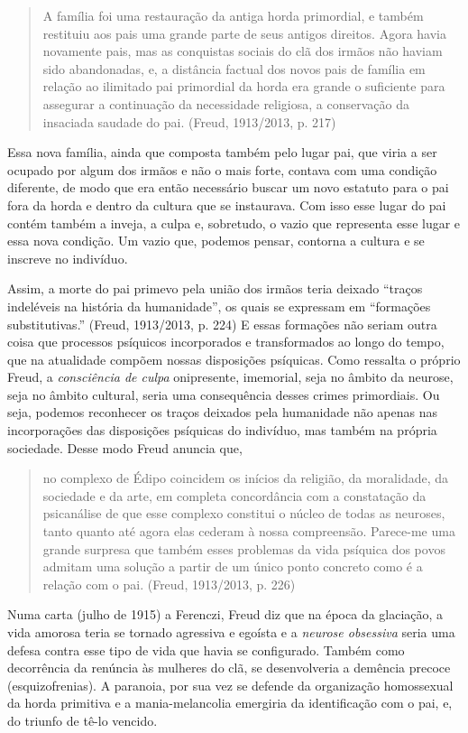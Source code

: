 \begin{quote}
A família foi uma restauração da antiga horda primordial, e também
restituiu aos pais uma grande parte de seus antigos direitos. Agora
havia novamente pais, mas as conquistas sociais do clã dos irmãos não
haviam sido abandonadas, e, a distância factual dos novos pais de
família em relação ao ilimitado pai primordial da horda era grande o
suficiente para assegurar a continuação da necessidade religiosa, a
conservação da insaciada saudade do pai. (Freud, 1913/2013, p. 217)
\end{quote}

Essa nova família, ainda que composta também pelo lugar pai, que viria a
ser ocupado por algum dos irmãos e não o mais forte, contava com uma
condição diferente, de modo que era então necessário buscar um novo
estatuto para o pai fora da horda e dentro da cultura que se instaurava.
Com isso esse lugar do pai contém também a inveja, a culpa e, sobretudo,
o vazio que representa esse lugar e essa nova condição. Um vazio que,
podemos pensar, contorna a cultura e se inscreve no indivíduo.

Assim, a morte do pai primevo pela união dos irmãos teria deixado
``traços indeléveis na história da humanidade'', os quais se expressam
em ``formações substitutivas.'' (Freud, 1913/2013, p. 224) E essas
formações não seriam outra coisa que processos psíquicos incorporados e
transformados ao longo do tempo, que na atualidade compõem nossas
disposições psíquicas. Como ressalta o próprio Freud, a
\emph{consciência de culpa} onipresente, imemorial, seja no âmbito da
neurose, seja no âmbito cultural, seria uma consequência desses crimes
primordiais. Ou seja, podemos reconhecer os traços deixados pela
humanidade não apenas nas incorporações das disposições psíquicas do
indivíduo, mas também na própria sociedade. Desse modo Freud anuncia
que,

\begin{quote}
no complexo de Édipo coincidem os inícios da religião, da moralidade, da
sociedade e da arte, em completa concordância com a constatação da
psicanálise de que esse complexo constitui o núcleo de todas as
neuroses, tanto quanto até agora elas cederam à nossa compreensão.
Parece-me uma grande surpresa que também esses problemas da vida
psíquica dos povos admitam uma solução a partir de um único ponto
concreto como é a relação com o pai. (Freud, 1913/2013, p. 226)
\end{quote}

Numa carta (julho de 1915) a Ferenczi, Freud diz que na época da
glaciação, a vida amorosa teria se tornado agressiva e egoísta e a
\emph{neurose obsessiva} seria uma defesa contra esse tipo de vida que
havia se configurado. Também como decorrência da renúncia às mulheres do
clã, se desenvolveria a demência precoce (esquizofrenias). A paranoia,
por sua vez se defende da organização homossexual da horda primitiva e a
mania-melancolia emergiria da identificação com o pai, e, do triunfo de
tê-lo vencido.


